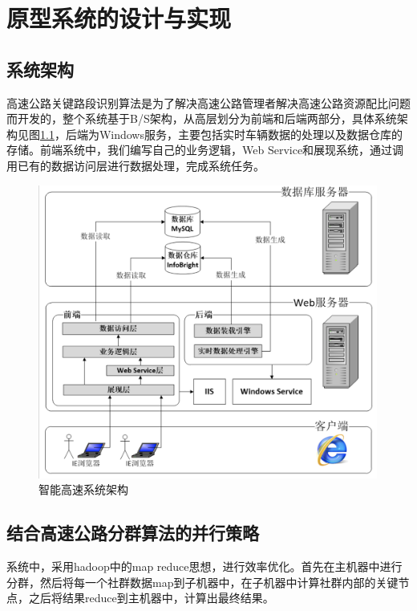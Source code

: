 
\chapter{原型系统的设计与实现}
	\section{系统架构}
		高速公路关键路段识别算法是为了解决高速公路管理者解决高速公路资源配比问题而开发的，整个系统基于B/S架构，从高层划分为前端和后端两部分，具体系统架构见图\ref{fig20}，后端为Windows服务，主要包括实时车辆数据的处理以及数据仓库的存储。前端系统中，我们编写自己的业务逻辑，Web Service和展现系统，通过调用已有的数据访问层进行数据处理，完成系统任务。

		\begin{figure}[h]
		\centering
				\begin{minipage}{0.8\linewidth}
					\centering
					\includegraphics[width=4.4in]{picture/jiagou}
					\caption{智能高速系统架构}
					\label{fig20}
				\end{minipage}%
		\end{figure}
	\section{结合高速公路分群算法的并行策略}
		系统中，采用hadoop中的map reduce思想，进行效率优化。首先在主机器中进行分群，然后将每一个社群数据map到子机器中，在子机器中计算社群内部的关键节点，之后将结果reduce到主机器中，计算出最终结果。

